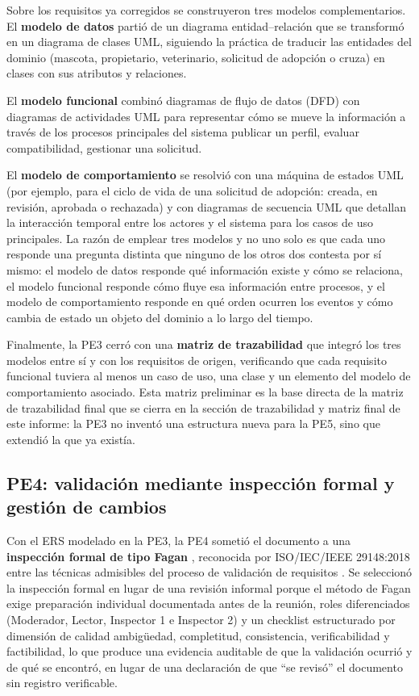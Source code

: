 \documentclass[journal,onecolumn]{IEEEtran}
\begin{document}
	Sobre los requisitos ya corregidos se construyeron tres modelos complementarios. El
	\textbf{modelo de datos} partió de un diagrama entidad--relación que se transformó en un
	diagrama de clases UML, siguiendo la práctica de traducir las entidades del dominio
	(mascota, propietario, veterinario, solicitud de adopción o cruza) en clases con sus
	atributos y relaciones. 
	
	El \textbf{modelo funcional} combinó diagramas de flujo de datos
	(DFD) con diagramas de actividades UML para representar cómo se mueve la información a
	través de los procesos principales del sistema publicar un perfil, evaluar
	compatibilidad, gestionar una solicitud. 
	
	El \textbf{modelo de comportamiento} se resolvió
	con una máquina de estados UML (por ejemplo, para el ciclo de vida de una solicitud de
	adopción: creada, en revisión, aprobada o rechazada) y con diagramas de secuencia UML que
	detallan la interacción temporal entre los actores y el sistema para los casos de uso
	principales. La razón de emplear tres modelos y no uno solo es que cada uno responde una
	pregunta distinta que ninguno de los otros dos contesta por sí mismo: el modelo de datos
	responde qué información existe y cómo se relaciona, el modelo funcional responde cómo
	fluye esa información entre procesos, y el modelo de comportamiento responde en qué orden
	ocurren los eventos y cómo cambia de estado un objeto del dominio a lo largo del tiempo.
	
	Finalmente, la PE3 cerró con una \textbf{matriz de trazabilidad} que integró los tres
	modelos entre sí y con los requisitos de origen, verificando que cada requisito funcional
	tuviera al menos un caso de uso, una clase y un elemento del modelo de comportamiento
	asociado. Esta matriz preliminar es la base directa de la matriz de trazabilidad final que
	se cierra en la sección de trazabilidad y matriz final de este informe: la PE3 no inventó
	una estructura nueva para la PE5, sino que extendió la que ya existía.
	
	\newpage
	
	\subsection{PE4: validación mediante inspección formal y gestión de cambios}
	
	Con el ERS modelado en la PE3, la PE4 sometió el documento a una \textbf{inspección formal
		de tipo Fagan} \cite{fagan1976}, reconocida por ISO/IEC/IEEE 29148:2018 entre las técnicas
	admisibles del proceso de validación de requisitos \cite{ieee29148}. Se seleccionó la
	inspección formal en lugar de una revisión informal porque el método de Fagan exige
	preparación individual documentada antes de la reunión, roles diferenciados (Moderador,
	Lector, Inspector 1 e Inspector 2) y un checklist estructurado por dimensión de calidad
	ambigüedad, completitud, consistencia, verificabilidad y factibilidad, lo que produce
	una evidencia auditable de que la validación ocurrió y de qué se encontró, en lugar de una
	declaración de que ``se revisó'' el documento sin registro verificable.
	
\end{document}

